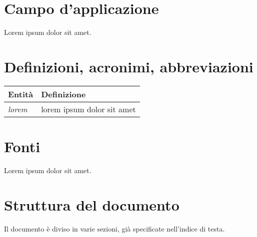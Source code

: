 \documentclass{scrreprt}
\begin{document}

\section{Campo d'applicazione}
Lorem ipsum dolor sit amet.


\section{Definizioni, acronimi, abbreviazioni}

\FloatBarrier
\begin{table}[h|]
\centering
\begin{tabular}{|l|p{12cm}|}
\hline
\textbf{Entità} & \textbf{Definizione} \\ \hline
\textit{lorem}  & { lorem ipsum dolor sit amet } \\ \hline
\end{tabular}
\end{table}
\FloatBarrier


\section{Fonti}
Lorem ipsum dolor sit amet.


\pagebreak

\section{Struttura del documento}
Il documento è diviso in varie sezioni, già specificate nell'indice
di testa.
\end{document}
